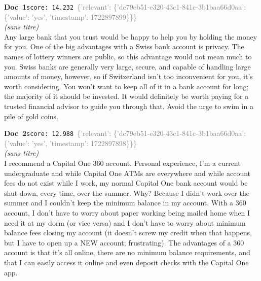 \documentclass[a4paper,11pt]{article}
\begin{document}
\begin{docenv}
{\footnotesize\textcolor{doccolor}{\textbf{Doc~1}}}\hfill{\tiny\texttt{score:~14.232}}\ {\tiny\textcolor{gray}{\{'relevant': \{'dc79eb51-e320-43c1-841c-3b1baa66d0aa': \{'value': 'yes', 'timestamp': 1722897899\}\}\}}}\\[3pt]
{\small\textit{(sans titre)}}\\[2pt]
\vspace{2pt}
{\footnotesize 
Any large bank that you trust would be happy to help you by holding the money for you.  One of the big advantages with a Swiss bank account is privacy. The names of lottery winners are public, so this advantage would not mean much to you. Swiss banks are generally very large, secure, and capable of handling large amounts of money, however, so if Switzerland isn't too inconvenient for you, it's worth considering.  You won't want to keep all of it in a bank account for long; the majority of it should be invested. It would definitely be worth paying for a trusted financial advisor to guide you through that.  Avoid the urge to swim in a pile of gold coins.}
\end{docenv}
\begin{docenv}
{\footnotesize\textcolor{doccolor}{\textbf{Doc~2}}}\hfill{\tiny\texttt{score:~12.988}}\ {\tiny\textcolor{gray}{\{'relevant': \{'dc79eb51-e320-43c1-841c-3b1baa66d0aa': \{'value': 'yes', 'timestamp': 1722897898\}\}\}}}\\[3pt]
{\small\textit{(sans titre)}}\\[2pt]
\vspace{2pt}
{\footnotesize 
I recommend a Capital One 360 account. Personal experience, I'm a current undergraduate and while Capital One ATMs are everywhere and while account fees do not exist while I work, my normal Capital One bank account would be shut down, every time, over the summer. Why? Because I didn't work over the summer and I couldn't keep the minimum balance in my account. With a 360 account, I don't have to worry about paper working being mailed home when I need it at my dorm (or vice versa) and I don't have to worry about minimum balance fees closing my account (it doesn't screw my credit when that happens, but I have to open up a NEW account; frustrating). The advantages of a 360 account is that it's all online, there are no minimum balance requirements, and that I can easily access it online and even deposit checks with the Capital One app.}
\end{docenv}
\end{document}
